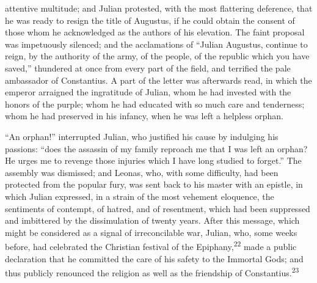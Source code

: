 attentive multitude; and Julian protested, with the most
flattering deference, that he was ready to resign the title of
Augustus, if he could obtain the consent of those whom he
acknowledged as the authors of his elevation. The faint proposal
was impetuously silenced; and the acclamations of “Julian
Augustus, continue to reign, by the authority of the army, of the
people, of the republic which you have saved,” thundered at once
from every part of the field, and terrified the pale ambassador
of Constantius. A part of the letter was afterwards read, in
which the emperor arraigned the ingratitude of Julian, whom he
had invested with the honors of the purple; whom he had educated
with so much care and tenderness; whom he had preserved in his
infancy, when he was left a helpless orphan.

“An orphan!” interrupted Julian, who justified his cause by
indulging his passions: “does the assassin of my family reproach
me that I was left an orphan? He urges me to revenge those
injuries which I have long studied to forget.” The assembly was
dismissed; and Leonas, who, with some difficulty, had been
protected from the popular fury, was sent back to his master with
an epistle, in which Julian expressed, in a strain of the most
vehement eloquence, the sentiments of contempt, of hatred, and of
resentment, which had been suppressed and imbittered by the
dissimulation of twenty years. After this message, which might be
considered as a signal of irreconcilable war, Julian, who, some
weeks before, had celebrated the Christian festival of the
Epiphany,\textsuperscript{22} made a public declaration that he committed the care
of his safety to the Immortal Gods; and thus publicly renounced
the religion as well as the friendship of Constantius.\textsuperscript{23}


